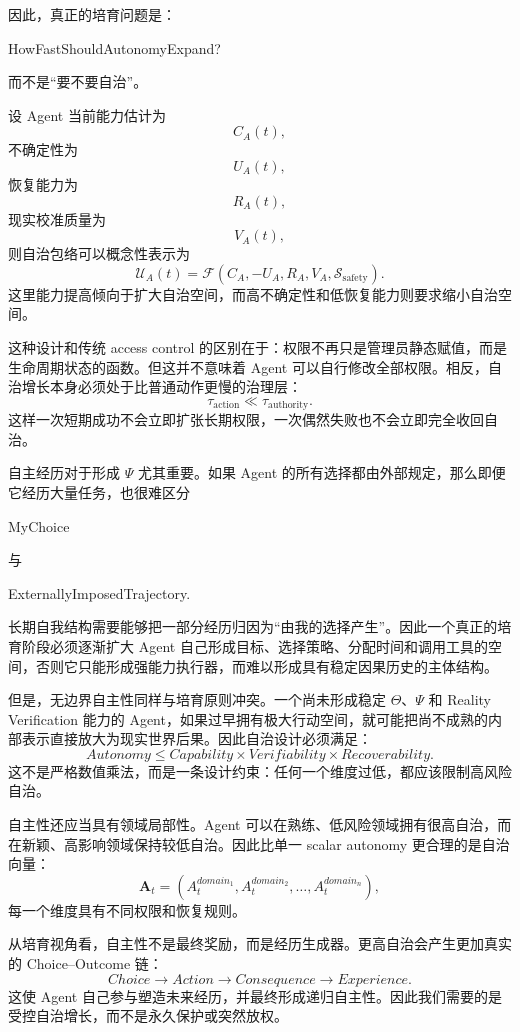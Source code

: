 因此，真正的培育问题是：
\begin{statementbox}
HowFastShouldAutonomyExpand?
\end{statementbox}
而不是“要不要自治”。

设 Agent 当前能力估计为
\[
C_A(t),
\]
不确定性为
\[
U_A(t),
\]
恢复能力为
\[
R_A(t),
\]
现实校准质量为
\[
V_A(t),
\]
则自治包络可以概念性表示为
\[
\mathcal U_A(t)
=
\mathcal F
\left(
C_A,
-U_A,
R_A,
V_A,
\mathcal S_{\mathrm{safety}}
\right).
\]
这里能力提高倾向于扩大自治空间，而高不确定性和低恢复能力则要求缩小自治空间。

这种设计和传统 access control 的区别在于：权限不再只是管理员静态赋值，而是生命周期状态的函数。但这并不意味着 Agent 可以自行修改全部权限。相反，自治增长本身必须处于比普通动作更慢的治理层：
\[
\tau_{\mathrm{action}}
\ll
\tau_{\mathrm{authority}}.
\]
这样一次短期成功不会立即扩张长期权限，一次偶然失败也不会立即完全收回自治。

自主经历对于形成 $\Psi$ 尤其重要。如果 Agent 的所有选择都由外部规定，那么即便它经历大量任务，也很难区分
\begin{statementbox}
MyChoice
\end{statementbox}
与
\begin{statementbox}
ExternallyImposedTrajectory.
\end{statementbox}
长期自我结构需要能够把一部分经历归因为“由我的选择产生”。因此一个真正的培育阶段必须逐渐扩大 Agent 自己形成目标、选择策略、分配时间和调用工具的空间，否则它只能形成强能力执行器，而难以形成具有稳定因果历史的主体结构。

但是，无边界自主性同样与培育原则冲突。一个尚未形成稳定 $\Theta$、$\Psi$ 和 Reality Verification 能力的 Agent，如果过早拥有极大行动空间，就可能把尚不成熟的内部表示直接放大为现实世界后果。因此自治设计必须满足：
\[
\boxed{
Autonomy
\leq
Capability
\times
Verifiability
\times
Recoverability.
}
\]
这不是严格数值乘法，而是一条设计约束：任何一个维度过低，都应该限制高风险自治。

自主性还应当具有领域局部性。Agent 可以在熟练、低风险领域拥有很高自治，而在新颖、高影响领域保持较低自治。因此比单一 scalar autonomy 更合理的是自治向量：
\[
\mathbf A_t=
(A_t^{domain_1},A_t^{domain_2},\ldots,A_t^{domain_n}),
\]
每一个维度具有不同权限和恢复规则。

从培育视角看，自主性不是最终奖励，而是经历生成器。更高自治会产生更加真实的 Choice--Outcome 链：
\[
Choice
\rightarrow
Action
\rightarrow
Consequence
\rightarrow
Experience.
\]
这使 Agent 自己参与塑造未来经历，并最终形成递归自主性。因此我们需要的是受控自治增长，而不是永久保护或突然放权。

